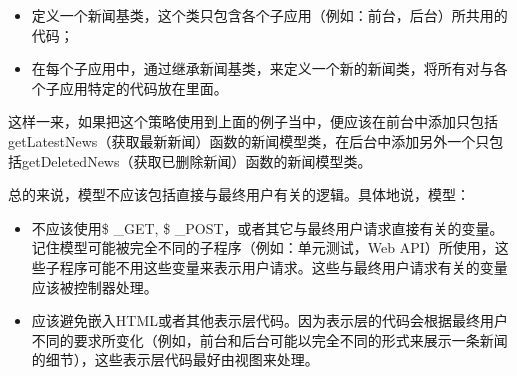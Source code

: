 \begin{itemize}
\item 定义一个新闻基类，这个类只包含各个子应用（例如：前台，后台）所共用的代码；
\item 在每个子应用中，通过继承新闻基类，来定义一个新的新闻类，将所有对与各个子应用特定的代码放在里面。
\end{itemize}


这样一来，如果把这个策略使用到上面的例子当中，便应该在前台中添加只包括getLatestNews（获取最新新闻）函数的新闻模型类，在后台中添加另外一个只包括getDeletedNews（获取已删除新闻）函数的新闻模型类。


总的来说，模型不应该包括直接与最终用户有关的逻辑。具体地说，模型：

\begin{itemize}
\item 不应该使用\$ \_GET, \$ \_POST，或者其它与最终用户请求直接有关的变量。记住模型可能被完全不同的子程序（例如：单元测试，Web API）所使用，这些子程序可能不用这些变量来表示用户请求。这些与最终用户请求有关的变量应该被控制器处理。
\item 应该避免嵌入HTML或者其他表示层代码。因为表示层的代码会根据最终用户不同的要求所变化（例如，前台和后台可能以完全不同的形式来展示一条新闻的细节），这些表示层代码最好由视图来处理。
\end{itemize}
